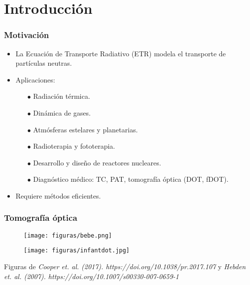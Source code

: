 \section{Introducción}
\begin{frame}
\frametitle{Motivación}
 \begin{itemize}%
	\item La Ecuación de Transporte Radiativo (ETR) 
	modela el transporte de partículas neutras.

	\item Aplicaciones: 
       \begin{itemize}
           \item[$\bullet$] Radiación térmica.

           \item[$\bullet$] Dinámica de gases. 
 
           \item[$\bullet$] Atmósferas estelares y planetarias.
 
           \item[$\bullet$] Radioterapia y fototerapia. 

           \item[$\bullet$] Desarrollo y diseño de reactores nucleares.

           \item[$\bullet$] Diagnóstico médico: TC, PAT, tomografía óptica (DOT, fDOT).
       \end{itemize}
       
       \item Requiere métodos eficientes.
       
 \end{itemize}
 
 
\end{frame}

\begin{frame}
\frametitle{Tomografía óptica}

\centering
\begin{figure}
\texttt{[image: figuras/bebe.png]} 
\end{figure}

\begin{figure}
\texttt{[image: figuras/infantdot.jpg]} 
\end{figure}

\tiny{Figuras de \textit{Cooper et. al. (2017). https://doi.org/10.1038/pr.2017.107} y \textit{Hebden et. al. (2007). https://doi.org/10.1007/s00330-007-0659-1}}
\end{frame}

